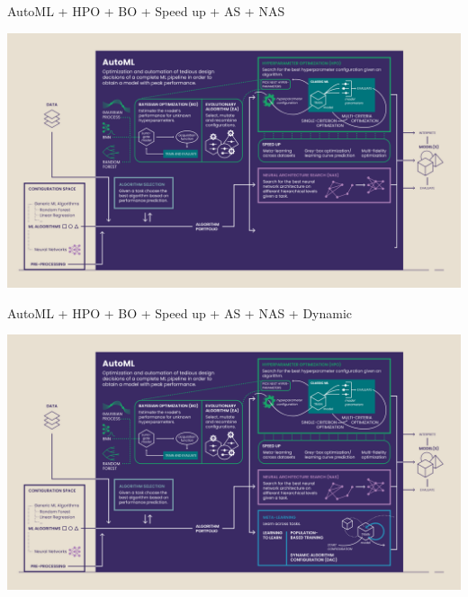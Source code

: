 	\begin{frame}[c]{AutoML + HPO + BO + Speed up + AS + NAS}
		
		\centering
		\includegraphics[width=.9\textwidth]{images/18_AutoML-Components-Overview-Infographic_corrected_e6}
		
	\end{frame}
	\begin{frame}[c]{AutoML + HPO + BO + Speed up + AS + NAS + Dynamic}
		
		\centering
		\includegraphics[width=.9\textwidth]{images/18_AutoML-Components-Overview-Infographic_corrected_e7}
		
	\end{frame}


